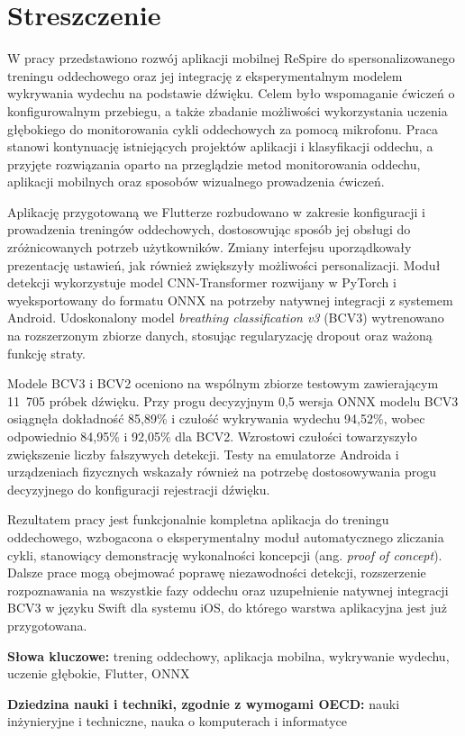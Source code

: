 \chapter*{Streszczenie}

\indent W pracy przedstawiono rozwój aplikacji mobilnej ReSpire do spersonalizowanego treningu oddechowego oraz jej integrację z eksperymentalnym modelem wykrywania wydechu na podstawie dźwięku. Celem było wspomaganie ćwiczeń o konfigurowalnym przebiegu, a także zbadanie możliwości wykorzystania uczenia głębokiego do monitorowania cykli oddechowych za pomocą mikrofonu. Praca stanowi kontynuację istniejących projektów aplikacji i klasyfikacji oddechu, a przyjęte rozwiązania oparto na przeglądzie metod monitorowania oddechu, aplikacji mobilnych oraz sposobów wizualnego prowadzenia ćwiczeń.

Aplikację przygotowaną we Flutterze rozbudowano w zakresie konfiguracji i prowadzenia treningów oddechowych, dostosowując sposób jej obsługi do zróżnicowanych potrzeb użytkowników. Zmiany interfejsu uporządkowały prezentację ustawień, jak również zwiększyły możliwości personalizacji. Moduł detekcji wykorzystuje model CNN-Transformer rozwijany w PyTorch i wyeksportowany do formatu ONNX na potrzeby natywnej integracji z systemem Android. Udoskonalony model \textit{breathing classification v3} (BCV3) wytrenowano na rozszerzonym zbiorze danych, stosując regularyzację dropout oraz ważoną funkcję straty.

Modele BCV3 i BCV2 oceniono na wspólnym zbiorze testowym zawierającym 11~705 próbek dźwięku. Przy progu decyzyjnym 0,5 wersja ONNX modelu BCV3 osiągnęła dokładność 85,89\% i czułość wykrywania wydechu 94,52\%, wobec odpowiednio 84,95\% i 92,05\% dla BCV2. Wzrostowi czułości towarzyszyło zwiększenie liczby fałszywych detekcji. Testy na emulatorze Androida i urządzeniach fizycznych wskazały również na potrzebę dostosowywania progu decyzyjnego do konfiguracji rejestracji dźwięku.

Rezultatem pracy jest funkcjonalnie kompletna aplikacja do treningu oddechowego, wzbogacona o eksperymentalny moduł automatycznego zliczania cykli, stanowiący demonstrację wykonalności koncepcji (ang. \textit{proof of concept}). Dalsze prace mogą obejmować poprawę niezawodności detekcji, rozszerzenie rozpoznawania na wszystkie fazy oddechu oraz uzupełnienie natywnej integracji BCV3 w języku Swift dla systemu iOS, do którego warstwa aplikacyjna jest już przygotowana.

\vspace{0.5cm}
\noindent\textbf{Słowa kluczowe:} trening oddechowy, aplikacja mobilna, wykrywanie wydechu, uczenie głębokie, Flutter, ONNX\vspace{0.5cm}

\noindent \textbf{Dziedzina nauki i techniki, zgodnie z wymogami OECD:} nauki inżynieryjne i techniczne, nauka o komputerach i informatyce